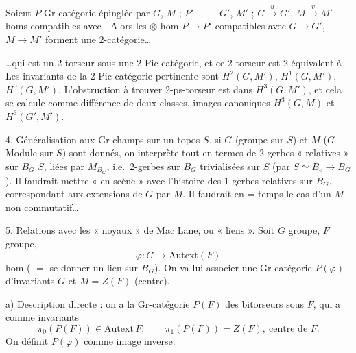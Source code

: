 \documentclass[11pt,a4paper]{article}
\begin{document}
Soient $P$ Gr-catégorie épinglée par $G$, $M$ ; $P'$ —— $G'$, $M'$ ;
$G \xrightarrow{\ u\ } G'$, $M \xrightarrow{\ v\ } M'$ homs compatibles
avec . Alors les $\otimes$-hom $P \to P'$
compatibles avec $G \to G'$, $M \to M'$ forment une 2-catégorie\ldots
{}

\ldots{}qui est un 2-torseur sous une 2-Pic-catégorie, et ce
2-torseur est 2-équivalent à . Les invariants de la 2-Pic-catégorie pertinente
sont $H^2(G,M')$, $H^1(G,M')$, $H^0(G,M')$. L'obstruction à trouver
 2-ps-torseur est dans $H^3(G,M')$, et cela se
calcule comme différence de deux classes, images canoniques
 $H^3(G,M)$ et $H^3(G',M')$.


4. Généralisation aux Gr-champs sur un topos $S$.  si $G$
(groupe sur $S$) et $M$ ($G$-Module sur $S$) sont donnés, on interprète
tout en termes de 2-gerbes « relatives » sur $B_G$  $S$,
liées par $M_{B_G}$, i.e.\ 2-gerbes sur $B_G$ trivialisées sur $S$ (par
$S \simeq B_e \to B_G$). Il faudrait  mettre « en scène »
avec l'histoire des 1-gerbes relatives sur $B_G$, correspondant aux
extensions de $G$ par $M$. Il faudrait  en = temps le
cas d'un $M$ non commutatif\ldots

5. Relations avec les « noyaux » de Mac Lane, ou « liens ». Soit $G$
groupe, $F$ groupe,
\[
\varphi : G \longrightarrow \mathrm{Autext}(F)
\]
hom ( $=$ se donner un lien sur $B_G$). On va lui associer
une Gr-catégorie  $P(\varphi)$ d'invariants $G$ et
$M = Z(F)$ (centre).

a) Description directe : on a la Gr-catégorie $P(F)$ des bitorseurs sous
$F$, qui a comme invariants
\[
\pi_0(P(F)) \in \mathrm{Autext}\,F ; \qquad \pi_1(P(F)) = Z(F),
\ \text{centre de } F.
\]
On définit  $P(\varphi)$ comme image inverse.

\end{document}
